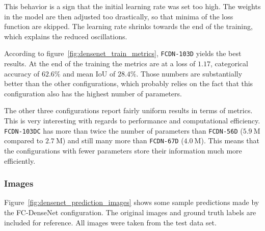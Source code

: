 This behavior is a sign that the initial learning rate was set too high. The weights in the model are then adjusted too drastically, so that minima of the loss function are skipped. The learning rate shrinks towards the end of the training, which explains the reduced oscillations.

According to figure~\ref{fig:densenet_train_metrics}, \texttt{FCDN-103D} yields the best results. At the end of the training the metrics are at a loss of $1.17$, categorical accuracy of $62.6\%$ and mean IoU of $28.4\%$. Those numbers are substantially better than the other configurations, which probably relies on the fact that this configuration also has the highest number of parameters.

The other three configurations report fairly uniform results in terms of metrics. This is very interesting with regards to performance and computational efficiency. \texttt{FCDN-103DC} has more than twice the number of parameters than \texttt{FCDN-56D} ($5.9~\text{M}$ compared to $2.7~\text{M}$) and still many more than \texttt{FCDN-67D} ($4.0~\text{M}$). This means that the configurations with fewer parameters store their information much more efficiently.

\subsubsection{Images}
Figure~\ref{fig:densenet_prediction_images} shows some sample predictions made by the FC-DenseNet configuration. The original images and ground truth labels are included for reference. All images were taken from the test data set.

